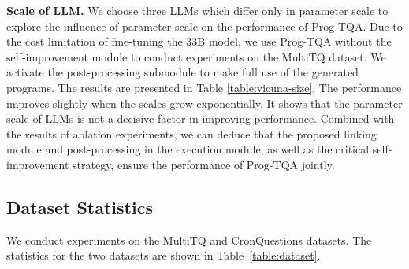 \documentclass[10pt, a4paper]{article}
\begin{document}
\textbf{Scale of LLM.} 
We choose three LLMs which differ only in parameter scale to explore the influence of parameter scale on the performance of Prog-TQA. Due to the cost limitation of fine-tuning the 33B model, we use Prog-TQA without the self-improvement module to conduct experiments on the MultiTQ dataset. We activate the post-processing submodule to make full use of the generated programs.
The results are presented in Table \ref{table:vicuna-size}. The performance improves slightly when the scales grow exponentially. 
It shows that the parameter scale of LLMs is not a decisive factor in improving performance. Combined with the results of ablation experiments, we can deduce that the proposed linking module and post-processing in the execution module, as well as the critical self-improvement strategy, ensure the performance of Prog-TQA jointly.
\subsection{Dataset Statistics}\label{app:dataset}
We conduct experiments on the MultiTQ and CronQuestions datasets. The statistics for the two datasets are shown in Table~\ref{table:dataset}.
\begin{table}[ht]
\caption{Statistic of question types on MultiTQ and CronQuestions datasets.}
\vspace{-1em}
\label{table:dataset}
\end{table}
\end{document}

